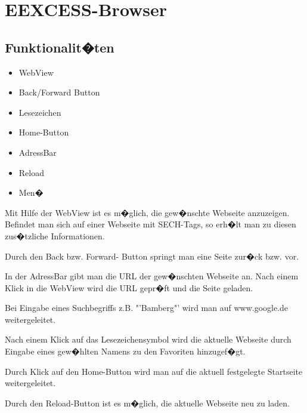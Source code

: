 \chapter*{EEXCESS-Browser}

\section{Funktionalit�ten}

\begin{itemize}
	\item WebView
	\item Back/Forward Button
	\item Lesezeichen
	\item Home-Button
	\item AdressBar
	\item Reload
	\item Men�
\end{itemize}

Mit Hilfe der WebView ist es m�glich, die gew�nschte Webseite anzuzeigen. Befindet man sich auf einer Webseite mit SECH-Tags, so erh�lt man zu diesen zus�tzliche Informationen.

Durch den Back bzw. Forward- Button springt man eine Seite zur�ck bzw. vor. 

In der AdressBar gibt man die URL der gew�nschten Webseite an. Nach einem Klick in die WebView wird die URL gepr�ft und die Seite geladen.

Bei Eingabe eines Suchbegriffs z.B. "'Bamberg"' wird man auf www.google.de weitergeleitet.

Nach einem Klick auf das Lesezeichensymbol wird die aktuelle Webseite durch Eingabe eines gew�hlten Namens zu den Favoriten hinzugef�gt. 

Durch Klick auf den Home-Button wird man auf die aktuell festgelegte Startseite weitergeleitet.

Durch den Reload-Button ist es m�glich, die aktuelle Webseite neu zu laden.